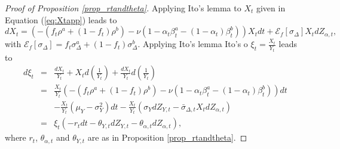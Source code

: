 \documentclass[preprint,11pt,authoryear]{elsarticle}
\theoremstyle{plain}
\begin{document}
\begin{proof}[Proof of Proposition \ref{prop_rtandtheta}]
Applying Ito's lemma to $X_t$ given in Equation (\ref{eq:Xtapp}) leads to 
\begin{equation}
    dX_t = \left(-\left(f_t\rho^a + \left(1-f_t\right)\rho^b\right) - \nu\left(1-\alpha_t \beta^a_t - \left(1-\alpha_t\right)\beta^b_t\right)\right)X_t dt + \mathcal{E}_{f}\left [ \sigma_{\Delta}  \right] X_t dZ_{\alpha,t},
\end{equation}
with $\mathcal{E}_{f} \left [ \sigma_{\Delta} \right] = f_t \sigma_{\Delta}^a  + \left(1-f_t\right)\sigma_{\Delta}^b$.  Applying Ito's lemma Ito's o $\xi_t = \frac{X_t}{Y_t}$ leads to
\begin{eqnarray}
    d\xi_t &=& \frac{dX_t}{Y_t} + X_td\left(\frac{1}{Y_t}\right) + \frac{dX_t}{Y_t}d\left(\frac{1}{Y_t}\right) \nonumber \\
    &=& \frac{X_t}{Y_t}\left(-\left(f_t\rho^a + \left(1-f_t\right)\rho^b\right) - \nu\left(1-\alpha_t \beta^a_t - \left(1-\alpha_t\right)\beta^b_t\right)\right)dt \nonumber \\
    && -\frac{X_t}{Y_t}\left( \mu_Y - \sigma_Y^2\right)dt - \frac{X_t}{Y_t}\left(\sigma_Y dZ_{Y,t} - \bar{\sigma}_{\Delta,t} X_t dZ_{\alpha,t}\right) \nonumber \\
    &=& \xi_t \left(-r_t dt - \theta_{Y,t}dZ_{Y,t}  - \theta_{\alpha,t}dZ_{\alpha,t}\right),
\end{eqnarray}
where $r_t$, $\theta_{\alpha,t}$ and $\theta_{Y,t}$ are as in Proposition \ref{prop_rtandtheta}.
\end{proof}



 
\end{document}
